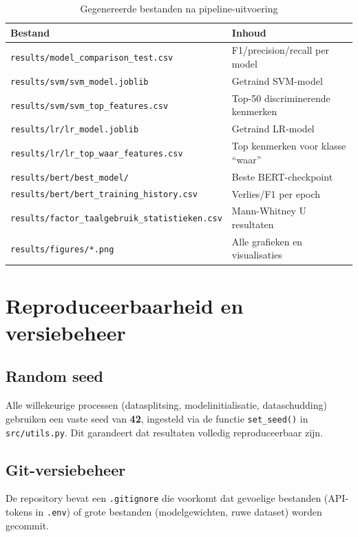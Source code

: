 \begin{table}[H]
\centering
\caption{Gegenereerde bestanden na pipeline-uitvoering}
\begin{tabular}{ll}
\toprule
\textbf{Bestand} & \textbf{Inhoud} \\
\midrule
\texttt{results/model\_comparison\_test.csv} & F1/precision/recall per model \\
\texttt{results/svm/svm\_model.joblib} & Getraind SVM-model \\
\texttt{results/svm/svm\_top\_features.csv} & Top-50 discriminerende kenmerken \\
\texttt{results/lr/lr\_model.joblib} & Getraind LR-model \\
\texttt{results/lr/lr\_top\_waar\_features.csv} & Top kenmerken voor klasse ``waar'' \\
\texttt{results/bert/best\_model/} & Beste BERT-checkpoint \\
\texttt{results/bert/bert\_training\_history.csv} & Verlies/F1 per epoch \\
\texttt{results/factor\_taalgebruik\_statistieken.csv} & Mann-Whitney U resultaten \\
\texttt{results/figures/*.png} & Alle grafieken en visualisaties \\
\bottomrule
\end{tabular}
\end{table}

\section{Reproduceerbaarheid en versiebeheer}
\label{sec:reproduceerbaarheid}

\subsection{Random seed}

Alle willekeurige processen (datasplitsing, modelinitialisatie, dataschudding)
gebruiken een vaste seed van \textbf{42}, ingesteld via de functie
\texttt{set\_seed()} in \texttt{src/utils.py}. Dit garandeert dat resultaten
volledig reproduceerbaar zijn.

\subsection{Git-versiebeheer}

De repository bevat een \texttt{.gitignore} die voorkomt dat gevoelige
bestanden (API-tokens in \texttt{.env}) of grote bestanden
(modelgewichten, ruwe dataset) worden gecommit.

